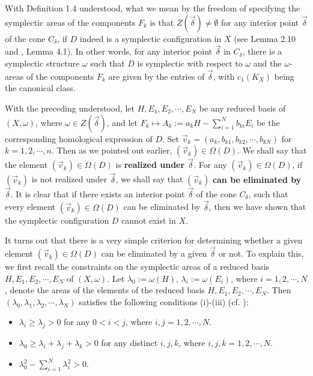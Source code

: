 \documentclass[11pt]{amsart}
\theoremstyle{plain}
\numberwithin{theorem}{section}
\theoremstyle{definition}
\begin{document}
With Definition 1.4 understood, what we mean by the freedom of specifying the symplectic areas of the components 
$F_k$ is that $Z(\vec{\delta})\neq \emptyset$ for any interior point $\vec{\delta}$ of the cone $C_\delta$, if 
$D$ indeed is a symplectic configuration in $X$ (see Lemma 2.10 and \cite{C}, Lemma 4.1). In other words, for any interior point $\vec{\delta}$ in $C_\delta$, there is a symplectic structure $\omega$ such that $D$ is symplectic with respect to $\omega$ and the $\omega$-areas of the components $F_k$ are given by the entries of $\vec{\delta}$,
with $c_1(K_X)$ being the canonical class. 

\vspace{2mm}

With the preceding understood, let $H,E_1,E_2,\cdots,E_N$ be any reduced basis of $(X,\omega)$, where 
$\omega\in Z(\vec{\delta})$, and let $F_k\mapsto A_k:=a_kH-\sum_{i=1}^N b_{ki}E_i$ be the corresponding homological expression of $D$. Set $\vec{v}_k=(a_k, b_{k1}, b_{k2}, \cdots, b_{kN})$ for $k=1,2,\cdots,n$. 
Then as we pointed out earlier, 
$(\vec{v}_k)\in \Omega(D)$. We shall say that the element $(\vec{v}_k)\in \Omega(D)$ is {\bf realized under 
$\vec{\delta}$}. For any $(\vec{v}_k)\in \Omega(D)$, if $(\vec{v}_k)$ is not realized under $\vec{\delta}$, we shall say that $(\vec{v}_k)$ {\bf can be eliminated by $\vec{\delta}$}. It is clear that if there exists an interior point 
$\vec{\delta}$ of the cone $C_\delta$, such that every element $(\vec{v}_k)\in \Omega(D)$ can be eliminated 
by $\vec{\delta}$, then we have shown that the symplectic configuration $D$ cannot exist in $X$.

It turns out that there is a very simple criterion for determining whether a given element $(\vec{v}_k)\in \Omega(D)$ 
can be eliminated by a given $\vec{\delta}$ or not. To explain this, we first recall the constraints on the symplectic areas of a reduced basis $H,E_1,E_2,\cdots,E_N$ of $(X,\omega)$. Let $\lambda_0:=\omega(H)$, 
$\lambda_i:=\omega(E_i)$, where $i=1,2,\cdots,N$, denote the areas of the elements of the reduced basis
$H,E_1,E_2,\cdots,E_N$. Then $(\lambda_0,\lambda_1,\lambda_2, \cdots,\lambda_N)$ satisfies the following conditions (i)-(iii) (cf. \cite{C}): 
\begin{itemize}
\item [{(i)}] $\lambda_i\geq \lambda_j>0$ for any $0<i<j$, where $i,j=1,2,\cdots,N$.
\item [{(ii)}] $\lambda_0\geq \lambda_i+\lambda_j+\lambda_k>0$
for any distinct $i,j,k$, where $i,j,k=1,2,\cdots,N$. 
\item [{(iii)}] $\lambda_0^2-\sum_{i=1}^N \lambda_i^2>0$. 
\end{itemize}
\end{document}
